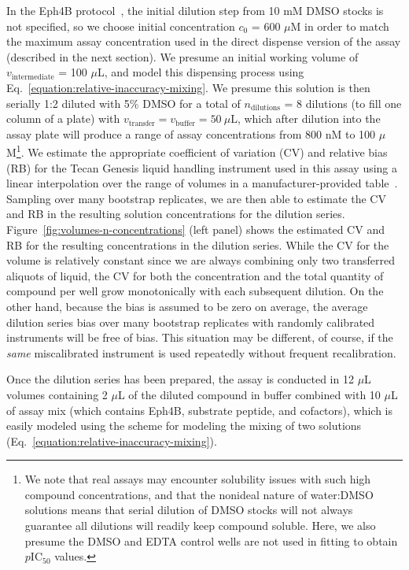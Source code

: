 \documentclass[aps,pre,twocolumn,nofootinbib,superscriptaddress,linenumbers]{revtex4-1}
\begin{document}
In the Eph4B protocol~\cite{barlaam_novel_2009,barlaam_pyrimidine_2010}, the initial dilution step from 10 mM DMSO stocks is not specified, so we choose initial concentration $c_0$ = 600 $\mu$M in order to match the maximum assay concentration used in the direct dispense version of the assay (described in the next section).
We presume an initial working volume of $v_\mathrm{intermediate}$ = 100 $\mu$L, and model this dispensing process using Eq.~\ref{equation:relative-inaccuracy-mixing}.
We presume this solution is then serially 1:2 diluted with 5\% DMSO for a total of $n_\mathrm{dilutions}$ = 8 dilutions (to fill one column of a plate) with $v_\mathrm{transfer} = v_\mathrm{buffer} = 50 \: \mu\mathrm{L}$, which after dilution into the assay plate will produce a range of assay concentrations from 800 nM to 100 $\mu$M\footnote{We note that real assays may encounter solubility issues with such high compound concentrations, and that the nonideal nature of water:DMSO solutions means that serial dilution of DMSO stocks will not always guarantee all dilutions will readily keep compound soluble.  Here, we also presume the DMSO and EDTA control wells are not used in fitting to obtain $p$IC$_{50}$ values.}.
We estimate the appropriate coefficient of variation (CV) and relative bias (RB) for the Tecan Genesis liquid handling instrument used in this assay using a linear interpolation over the range of volumes in a manufacturer-provided table~\cite{_tecan_2001}.
Sampling over many bootstrap replicates, we are then able to estimate the CV and RB in the resulting solution concentrations for the dilution series.
Figure~\ref{fig:volumes-n-concentrations} (left panel) shows the estimated CV and RB for the resulting concentrations in the dilution series.
While the CV for the volume is relatively constant since we are always combining only two transferred aliquots of liquid, the CV for both the concentration and the total quantity of compound per well grow monotonically with each subsequent dilution.
On the other hand, because the bias is assumed to be zero on average, the average dilution series bias over many bootstrap replicates with randomly calibrated instruments will be free of bias.
This situation may be different, of course, if the \emph{same} miscalibrated instrument is used repeatedly without frequent recalibration.

Once the dilution series has been prepared, the assay is conducted in 12 $\mu$L volumes containing 2 $\mu$L of the diluted compound in buffer combined with 10 $\mu$L of assay mix (which contains Eph4B, substrate peptide, and cofactors), which is easily modeled using the scheme for modeling the mixing of two solutions (Eq.~\ref{equation:relative-inaccuracy-mixing}).
\end{document}
